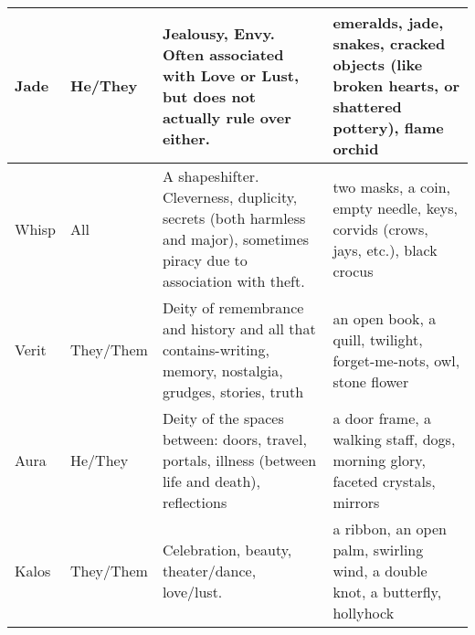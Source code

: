 \documentclass[blue]{GL2020}
\begin{document}
\begin{tabularx}{\textwidth}{|>{\centering\arraybackslash} m{1.8cm} |>{\centering\arraybackslash} m{1.5cm} | X |X |}
\hline	
	Jade & He/They & Jealousy, Envy. Often associated with Love or Lust, but does not actually rule over either. & emeralds, jade, snakes, cracked objects (like broken hearts, or shattered pottery), flame orchid \\
\hline	
	Whisp & All & A shapeshifter. Cleverness, duplicity, secrets (both harmless and major), sometimes piracy due to association with theft. & two masks, a coin, empty needle, keys, corvids (crows, jays, etc.), black crocus \\
\hline	
	Verit & They/Them & Deity of remembrance and history and all that contains-writing, memory, nostalgia, grudges, stories, truth & an open book, a quill, twilight, forget-me-nots, owl, stone flower \\
\hline	
	Aura & He/They & Deity of the spaces between: doors, travel, portals, illness (between life and death), reflections & a door frame, a walking staff, dogs, morning glory, faceted crystals, mirrors \\
\hline	
	Kalos & They/Them & Celebration, beauty, theater/dance, love/lust. & a ribbon, an open palm, swirling wind, a double knot, a butterfly, hollyhock \\
\hline	
\end{tabularx}
\end{document}
